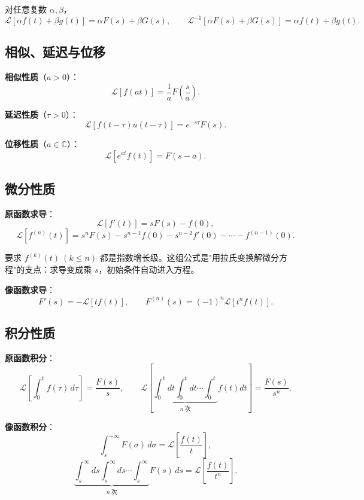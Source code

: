 对任意复数 \(\alpha,\beta\)，
\[
\mathscr{L}[\alpha f(t)+\beta g(t)]=\alpha F(s)+\beta G(s),\qquad
\mathscr{L}^{-1}[\alpha F(s)+\beta G(s)]=\alpha f(t)+\beta g(t).
\]

\subsection{相似、延迟与位移}

\textbf{相似性质}（\(a>0\)）：
\[
\mathscr{L}[f(at)]=\frac{1}{a}F\!\left(\frac{s}{a}\right).
\]

\textbf{延迟性质}（\(\tau>0\)）：
\[
\mathscr{L}\left[f(t-\tau)u(t-\tau)\right]=e^{-s\tau}F(s).
\]

\textbf{位移性质}（\(a\in\mathbb{C}\)）：
\[
\mathscr{L}\left[e^{at}f(t)\right]=F(s-a).
\]


\subsection{微分性质}

\textbf{原函数求导}：
\[
\mathscr{L}\left[f'(t)\right]=sF(s)-f(0),
\]
\[
\mathscr{L}\left[f^{(n)}(t)\right]=s^nF(s)-s^{n-1}f(0)-s^{n-2}f'(0)-\cdots-f^{(n-1)}(0).
\]


要求 \(f^{(k)}(t)\ (k\le n)\) 都是指数增长级。这组公式是"用拉氏变换解微分方程"的支点：求导变成乘 \(s\)，初始条件自动进入方程。

\textbf{像函数求导}：
\[
F'(s)=-\mathscr{L}[tf(t)],\qquad
F^{(n)}(s)=(-1)^n\mathscr{L}[t^nf(t)].
\]

\subsection{积分性质}

\textbf{原函数积分}：
\[
\mathscr{L}\left[\int_0^tf(\tau)\,d\tau\right]=\frac{F(s)}{s},
\qquad
\mathscr{L}\left[\underbrace{\int_0^t\!dt\int_0^t\!dt\cdots\int_0^t}_{n\ \text{次}}f(t)dt\right]=\frac{F(s)}{s^n}.
\]

\textbf{像函数积分}：
\[
\int_s^{+\infty}F(\sigma)\,d\sigma=\mathscr{L}\left[\frac{f(t)}{t}\right],
\]
\[
\underbrace{\int_s^\infty\!ds\int_s^\infty\!ds\cdots\int_s^\infty}_{n\ \text{次}}F(s)\,ds
=\mathscr{L}\left[\frac{f(t)}{t^n}\right].
\]

